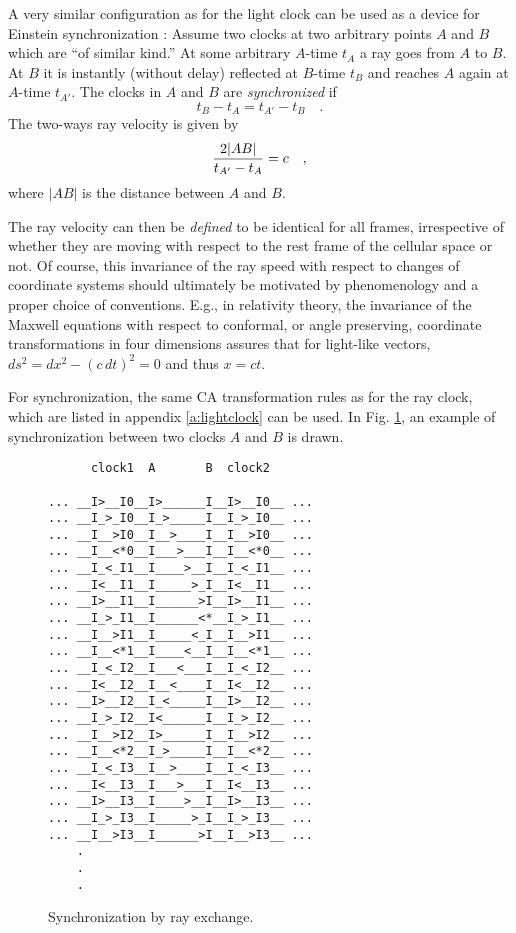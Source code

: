 \documentclass[pra,amsfonts, twocolumn]{revtex4}
\begin{document}
A very similar configuration as for the light clock can be used as a
device for Einstein synchronization \cite{einstein:1905,sv:93}:
 Assume two clocks at two arbitrary points $A$ and $B$ which are ``of
similar
 kind.''
 At some arbitrary $A$-time $t_A$ a  ray goes from $A$ to $B$. At $B$
it is instantly (without delay)
 reflected  at $B$-time $t_B$ and reaches $A$ again at
 $A$-time $t_{A'}$. The clocks in $A$ and $B$ are {\em synchronized}
 if
\begin{equation}
 t_B-t_A=t_{A'}-t_B \quad .
\label{e:1}
\end{equation}
 The two-ways ray velocity is given by
\begin{equation}
 {2 \vert {AB}\vert \over t_{A'}-t_A}=c \quad ,
\end{equation}
 where $\vert AB\vert $ is the distance between $A$ and $B$.

 The ray velocity can then be
{\em defined} to be identical for all frames, irrespective of
whether
 they are moving with respect to the rest frame of the cellular
 space or not.
Of course, this invariance of the ray speed with respect to
changes of coordinate systems should ultimately be motivated by
phenomenology and a proper choice of conventions. E.g., in relativity
theory, the invariance of the Maxwell
equations with respect to conformal, or angle preserving, coordinate
transformations in four dimensions assures
that for light-like vectors, $ds^2=dx^2-(c\,dt)^2=0$ and thus $x=ct$.


For synchronization, the same CA transformation rules as for the ray
clock, which are listed in appendix
\ref{a:lightclock} can be used.
In Fig. \ref{synchro}, an example of synchronization between two clocks
$A$ and $B$
is drawn.
\begin{figure}
 {\tiny
 \begin{verbatim}
      clock1  A       B  clock2

... __I>__I0__I>______I__I>__I0__ ...
... __I_>_I0__I_>_____I__I_>_I0__ ...
... __I__>I0__I__>____I__I__>I0__ ...
... __I__<*0__I___>___I__I__<*0__ ...
... __I_<_I1__I____>__I__I_<_I1__ ...
... __I<__I1__I_____>_I__I<__I1__ ...
... __I>__I1__I______>I__I>__I1__ ...
... __I_>_I1__I______<*__I_>_I1__ ...
... __I__>I1__I_____<_I__I__>I1__ ...
... __I__<*1__I____<__I__I__<*1__ ...
... __I_<_I2__I___<___I__I_<_I2__ ...
... __I<__I2__I__<____I__I<__I2__ ...
... __I>__I2__I_<_____I__I>__I2__ ...
... __I_>_I2__I<______I__I_>_I2__ ...
... __I__>I2__I>______I__I__>I2__ ...
... __I__<*2__I_>_____I__I__<*2__ ...
... __I_<_I3__I__>____I__I_<_I3__ ...
... __I<__I3__I___>___I__I<__I3__ ...
... __I>__I3__I____>__I__I>__I3__ ...
... __I_>_I3__I_____>_I__I_>_I3__ ...
... __I__>I3__I______>I__I__>I3__ ...
    .
    .
    .
 \end{verbatim}  }
\caption{Synchronization by ray exchange. \label{synchro}}
\end{figure}
\end{document}
